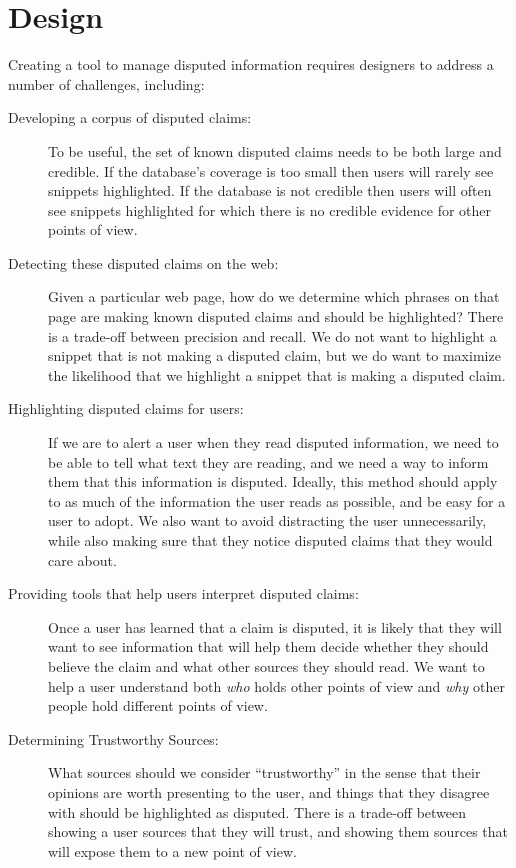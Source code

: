 \documentclass{www2010-submission}
\begin{document}
\section{Design}

Creating a tool to manage disputed information requires designers to address a number of challenges, including:

\begin{description}
\item[Developing a corpus of disputed claims:] To be useful, the set of known disputed claims needs to be both large and credible. If the database's coverage is too small then users will rarely see snippets highlighted. If the database is not credible then users will often see snippets highlighted for which there is no credible evidence for other points of view.

\item[Detecting these disputed claims on the web:] Given a particular web page, how do we determine which phrases on that page are making known disputed claims and should be highlighted? There is a trade-off between precision and recall. We do not want to highlight a snippet that is not making a disputed claim, but we do want to maximize the likelihood that we highlight a snippet that is making a disputed claim.

\item[Highlighting disputed claims for users:] If we are to alert a user when they read disputed information, we need to be able to tell what text they are reading, and we need a way to inform them that this information is disputed. Ideally, this method should apply to as much of the information the user reads as possible, and be easy for a user to adopt. We also want to avoid distracting the user unnecessarily, while also making sure that they notice disputed claims that they would care about.

\item[Providing tools that help users interpret disputed claims:] Once a user has learned that a claim is disputed, it is likely that they will want to see information that will help them decide whether they should believe the claim and what other sources they should read. We want to help a user understand both {\it who} holds other points of view and {\it why} other people hold different points of view.

\item[Determining Trustworthy Sources:] What sources should we consider ``trustworthy'' in the sense that their opinions are worth presenting to the user, and things that they disagree with should be highlighted as disputed. There is a trade-off between showing a user sources that they will trust, and showing them sources that will expose them to a new point of view.
\end{description}
\end{document}
